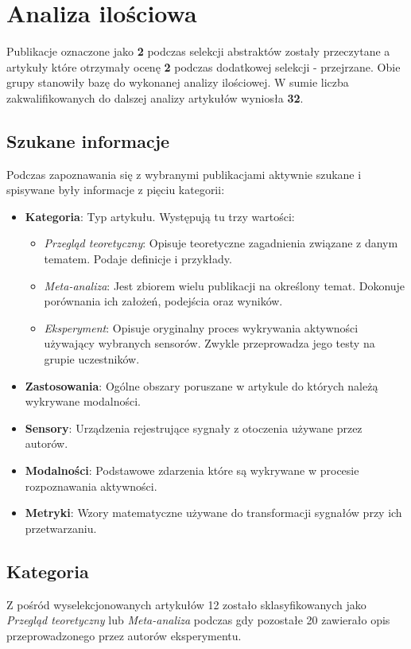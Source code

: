\section{Analiza ilościowa}
Publikacje oznaczone jako {\bf 2} podczas selekcji abstraktów zostały przeczytane a artykuły które otrzymały ocenę {\bf 2} podczas dodatkowej selekcji - przejrzane. Obie grupy stanowiły bazę do wykonanej analizy ilościowej. W sumie liczba zakwalifikowanych do dalszej analizy artykułów wyniosła {\bf 32}.

\subsection{Szukane informacje}
Podczas zapoznawania się z wybranymi publikacjami aktywnie szukane i spisywane były informacje z pięciu kategorii:
\begin{itemize}
    \item {\bf Kategoria}: Typ artykułu. Występują tu trzy wartości:
    \begin{itemize}
		\item {\it Przegląd teoretyczny}: Opisuje teoretyczne zagadnienia związane z danym tematem. Podaje definicje i przykłady.
		\item {\it Meta-analiza}: Jest zbiorem wielu publikacji na określony temat. Dokonuje porównania ich założeń, podejścia oraz wyników.
		\item {\it Eksperyment}: Opisuje oryginalny proces wykrywania aktywności używający wybranych sensorów. Zwykle przeprowadza jego testy na grupie uczestników.
	\end{itemize}
    \item {\bf Zastosowania}: Ogólne obszary poruszane w artykule do których należą wykrywane modalności.
    \item {\bf Sensory}: Urządzenia rejestrujące sygnały z otoczenia używane przez autorów.
    \item {\bf Modalności}: Podstawowe zdarzenia które są wykrywane w procesie rozpoznawania aktywności.
    \item {\bf Metryki}: Wzory matematyczne używane do transformacji sygnałów przy ich przetwarzaniu.
\end{itemize}

\subsection{Kategoria}
Z pośród wyselekcjonowanych artykułów 12 zostało sklasyfikowanych jako \textit{Przegląd teoretyczny} lub \textit{Meta-analiza} podczas gdy pozostałe 20 zawierało opis przeprowadzonego przez autorów eksperymentu. 

